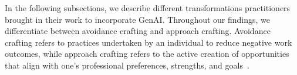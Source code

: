 


In the following subsections, we describe different transformations practitioners brought in their work to incorporate GenAI. Throughout our findings, we differentiate between avoidance crafting and approach crafting. Avoidance crafting refers to practices undertaken by an individual to reduce negative work outcomes, while approach crafting refers to the active creation of opportunities that align with one's professional preferences, strengths, and goals~\cite{zhang_2019}.
